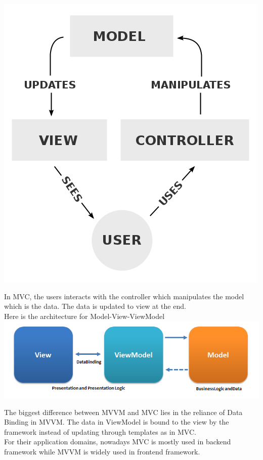 \documentclass[a4paper]{article}
\begin{document}
\includegraphics[scale = 0.5]{img/mvc.png}

In MVC, the users interacts with the controller which manipulates the model which is the data. The data is updated to view at the end.\\

Here is the architecture for Model-View-ViewModel\\

\includegraphics[scale = 0.5]{img/mvvm.png}

The biggest difference between MVVM and MVC lies in the reliance of Data Binding in MVVM. The data in ViewModel is bound to the view by the framework instead of updating through templates as in MVC.\\

For their application domains, nowadays MVC is mostly used in backend framework while MVVM is widely used in frontend framework.
\end{document}
